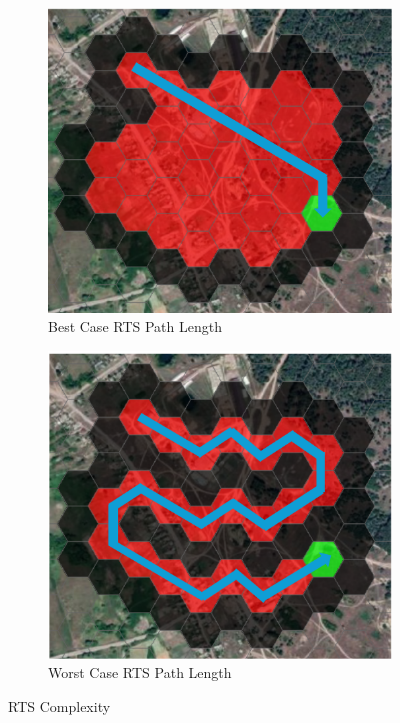 \begin{figure}[htbp]
  \centering
  \begin{subfigure}[b]{0.48\textwidth}
    \includegraphics[width=\textwidth]{figs/Thomas/Return To Safety/typical_case_complexity.png}
    \caption{Best Case RTS Path Length}
    \label{fig:typical_case}
  \end{subfigure}
  \hfill
  \begin{subfigure}[b]{0.48\textwidth}
    \includegraphics[width=\textwidth]{figs/Thomas/Return To Safety/worst_case_complexity.png}
    \caption{Worst Case RTS Path Length}
    \label{fig:worst_case}
\end{subfigure}
\caption{RTS Complexity}
\label{fig:rts_complexity}
\end{figure}